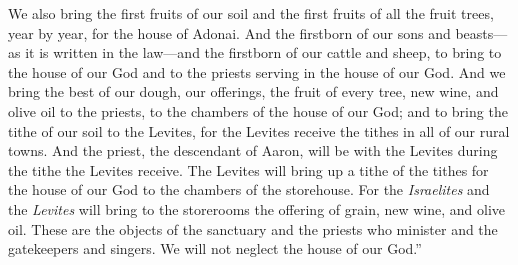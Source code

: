 \begin{biblechapter}
\verse We also bring the first fruits of our soil and the first fruits of all the fruit trees, year by year, for the house of Adonai.
\verse And the firstborn of our sons and beasts—as it is written in the law—and the firstborn of our cattle and sheep, to bring to the house of our God and to the priests serving in the house of our God.
\verse And we bring the best of our dough, our offerings, the fruit of every tree, new wine, and olive oil to the priests, to the chambers of the house of our God; and to bring the tithe of our soil to the Levites, for the Levites receive the tithes in all of our rural towns.
\verse And the priest, the descendant of Aaron, will be with the Levites during the tithe the Levites receive. The Levites will bring up a tithe of the tithes for the house of our God to the chambers of the storehouse.
\verse For the \textit{Israelites} and the \textit{Levites} will bring to the storerooms the offering of grain, new wine, and olive oil. These are the objects of the sanctuary and the priests who minister and the gatekeepers and singers. We will not neglect the house of our God.”
\end{biblechapter}

